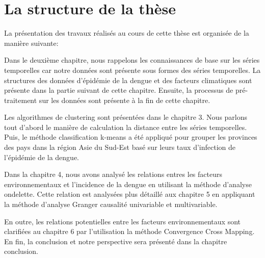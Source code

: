 \section{La structure de la thèse}
La présentation des travaux réalisés au cours de cette thèse est organisée de la manière suivante:

Dans le deuxième chapitre, nous rappelons les connaissances de base sur les séries temporelles car notre données sont présente sous formes des séries temporelles. La structures des données d'épidémie de la dengue et des facteurs climatiques sont présente dans la partie suivant de cette chapitre. Ensuite, la processus de pré-traitement sur les données sont présente à la fin de cette chapitre. 

Les algorithmes de clustering sont présentées dans le chapitre 3. Nous parlons tout d'abord le manière de calculation la distance entre les séries temporelles. Puis, le méthode classification k-means a été appliqué pour grouper les provinces des pays dans la région Asie du Sud-Est basé sur leurs taux d'infection de l'épidémie de la dengue. 

Dans la chapitre 4, nous avons analysé les relations entres les facteurs environnementaux et l'incidence de la dengue en utilisant la méthode d'analyse ondelette. Cette relation est analysées plus détaillé aux chapitre 5 en appliquant la méthode d'analyse Granger causalité univariable et multivariable. 

En outre, les relations potentielles entre les facteurs environnementaux sont clarifiées au chapitre 6 par l'utilisation la méthode Convergence Cross Mapping. En fin, la conclusion et notre perspective sera présenté dans la chapitre conclusion.

